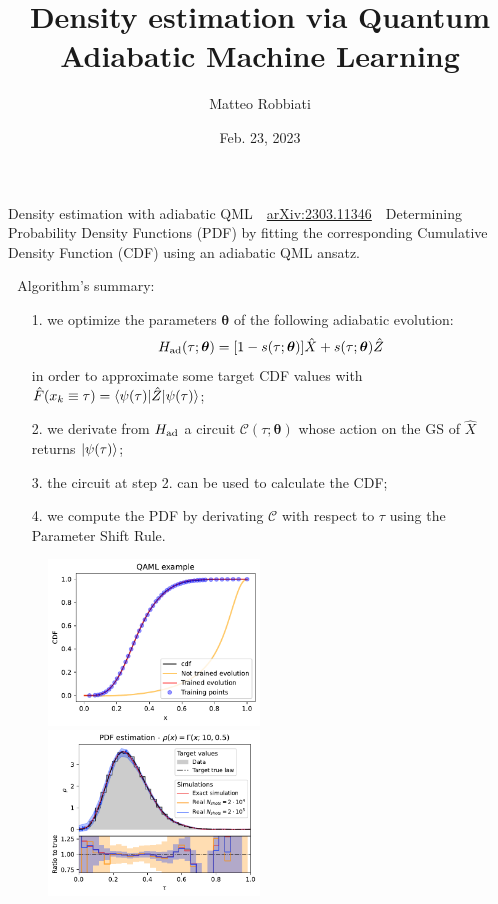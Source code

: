 \documentclass[8pt, xcolor={svgnames}]{beamer}
\title{Density estimation via Quantum Adiabatic Machine Learning}
\date{Feb. 23, 2023}
\author[Matteo Robbiati]{Matteo Robbiati}
\begin{document}
\begin{frame}{Density estimation with adiabatic QML  \hfill \faBook\,\, \href{https://arxiv.org/abs/2303.11346}{arXiv:2303.11346}}
\small
\faCrosshairs\,\, Determining Probability Density Functions (PDF) by fitting the 
corresponding Cumulative Density Function (CDF) using an adiabatic QML ansatz.

\faFlash\,\, Algorithm's summary:
\begin{itemize}[noitemsep]
\item[1.] we optimize the parameters $\bm{\theta}$ of the following adiabatic evolution:
\begin{equation} 
H_{\rm ad}(\tau; \bm{\theta}) = [1-s(\tau; \bm{\theta})] \hat{X} + s(\tau; \bm{\theta})\hat{Z}
\end{equation}
in order to approximate some target CDF values with $\hat{F}(x_k \equiv \tau) = \braket{\psi(\tau)|\hat{Z}|\psi(\tau)}$;
\item[2.] we derivate from $H_{\rm ad}$ a circuit $\mathcal{C}(\tau; \bm{\theta})$ whose action 
on the GS of $\hat{X}$ returns $\ket{\psi(\tau)}$;
\item[3.] the circuit at step 2. can be used to calculate the CDF;
\item[4.] we compute the PDF by derivating $\mathcal{C}$ with respect to $\tau$ 
using the Parameter Shift Rule.
\end{itemize}
\begin{figure}  
    \includegraphics[width=0.5\textwidth]{figures/evolution.pdf}%
    \includegraphics[width=0.5\textwidth]{figures/PDF.pdf}
\end{figure}


\end{frame}
\end{document}
